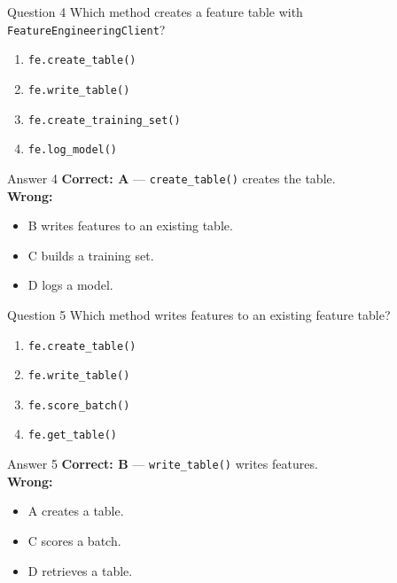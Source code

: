 \documentclass[aspectratio=169,11pt]{beamer}
\begin{document}
	\begin{frame}{Question 4}
		Which method creates a feature table with \texttt{FeatureEngineeringClient}?
		\begin{enumerate}[label=\Alph*.]
			\item \texttt{fe.create\_table()}
			\item \texttt{fe.write\_table()}
			\item \texttt{fe.create\_training\_set()}
			\item \texttt{fe.log\_model()}
		\end{enumerate}
	\end{frame}
	\begin{frame}{Answer 4}
		\textbf{Correct: A} --- \texttt{create\_table()} creates the table.\\
		\vspace{0.5em}
		\textbf{Wrong:}
		\begin{itemize}
			\item B writes features to an existing table.
			\item C builds a training set.
			\item D logs a model.
		\end{itemize}
	\end{frame}
	
	\begin{frame}{Question 5}
		Which method writes features to an existing feature table?
		\begin{enumerate}[label=\Alph*.]
			\item \texttt{fe.create\_table()}
			\item \texttt{fe.write\_table()}
			\item \texttt{fe.score\_batch()}
			\item \texttt{fe.get\_table()}
		\end{enumerate}
	\end{frame}
	\begin{frame}{Answer 5}
		\textbf{Correct: B} --- \texttt{write\_table()} writes features.\\
		\vspace{0.5em}
		\textbf{Wrong:}
		\begin{itemize}
			\item A creates a table.
			\item C scores a batch.
			\item D retrieves a table.
		\end{itemize}
	\end{frame}
	
\end{document}
